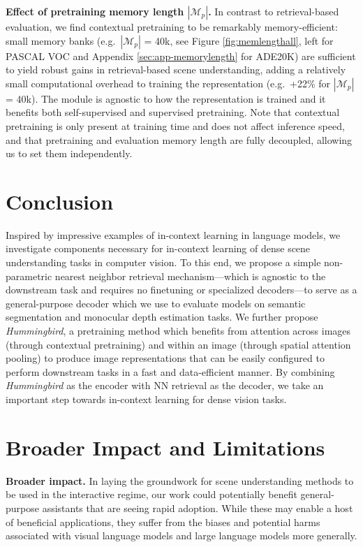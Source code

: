 \documentclass{article}
\newcommand{\ours}{\textit{Hummingbird} }
\newcommand{\eg}{e.g.\ }
\begin{document}
\textbf{Effect of pretraining memory length $|\mathcal{M}_p|$. } In contrast to retrieval-based evaluation, we find contextual pretraining to be remarkably memory-efficient: small memory banks (\eg $|\mathcal{M}_p|$ = 40k, see Figure \ref{fig:memlengthall}, left for PASCAL VOC and Appendix \ref{sec:app-memorylength} for ADE20K) are sufficient to yield robust gains in retrieval-based scene understanding, adding a relatively small computational overhead to training the representation (e.g.\ +22\% for $|\mathcal{M}_p|$ = 40k). The module is agnostic to how the representation is trained and it benefits both self-supervised and supervised pretraining. Note that contextual pretraining is only present at training time and does not affect inference speed, and that pretraining and evaluation memory length are fully decoupled, allowing us to set them independently.




\section{Conclusion}

Inspired by impressive examples of in-context learning in language models, we investigate components necessary for in-context learning of dense scene understanding tasks in computer vision. To this end, we propose a simple non-parametric nearest neighbor retrieval mechanism---which is agnostic to the downstream task and requires no finetuning or specialized decoders---to serve as a general-purpose decoder which we use to evaluate models on semantic segmentation and monocular depth estimation tasks. We further propose \textit{Hummingbird}, a pretraining method which benefits from attention across images (through contextual pretraining) and within an image (through spatial attention pooling) to produce image representations that can be easily configured to perform downstream tasks in a fast and data-efficient manner. By combining \ours as the encoder with NN retrieval as the decoder, we take an important step towards in-context learning for dense vision tasks.

\section{Broader Impact and Limitations}

\textbf{Broader impact. } In laying the groundwork for scene understanding methods to be used in the interactive regime, our work could potentially benefit general-purpose assistants that are seeing rapid adoption. While these may enable a host of beneficial applications, they suffer from the biases and potential harms associated with visual language models and large language models more generally.
\end{document}
